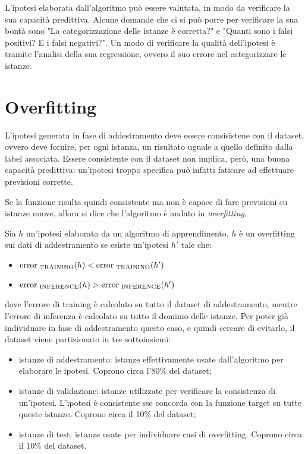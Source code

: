 L'ipotesi elaborata dall'algoritmo può essere valutata, in modo da verificare la
sua capacità predittiva. Alcune domande che ci si può porre per verificare la
sua bontà sono "La categorizzazione delle istanze è corretta?" e "Quanti sono i
falsi positivi? E i falsi negativi?".
Un modo di verificare la qualità dell'ipotesi è tramite l'analisi della sua
regressione, ovvero il suo errore nel categorizzare le istanze.

\section{Overfitting}
L'ipotesi generata in fase di addestramento deve essere consisistene con il
dataset, ovvero deve fornire, per ogni istanza, un risultato uguale a quello
definito dalla label associata.
Essere consistente con il dataset non implica, però, una buona capacità
predittiva: un'ipotesi troppo specifica può infatti faticare ad effettuare
previsioni corrette.

Se la funzione risulta quindi consistente ma non è capace di fare previsioni su
istanze nuove, allora si dice che l'algoritmo è andato in \textit{overfitting}.

Sia $h$ un'ipotesi elaborata da un algoritmo di apprendimento, $h$ è un
overfitting sui dati di addestramento se esiste un'ipotesi $h'$ tale che:
\begin{itemize}
    \item $\textnormal{error}_{\textnormal{ TRAINING}} (h) < 
    \textnormal{error}_{\textnormal{ TRAINING}} (h')$
    \item $\textnormal{error}_{\textnormal{ INFERENCE}} (h) > 
    \textnormal{error}_{\textnormal{ INFERENCE}} (h')$
\end{itemize}
dove l'errore di training è calcolato su tutto il dataset di addestramento,
mentre l'errore di inferenza è calcolato su tutto il dominio delle istanze.
Per poter già individuare in fase di addestramento questo caso, e quindi cercare
di evitarlo, il dataset viene partizionato in tre sottoinsiemi:
\begin{itemize}
    \item istanze di addestramento: istanze effettivamente usate dall'algoritmo
    per elaborare le ipotesi. Coprono circa l'80\% del dataset;
    \item istanze di validazione: istanze utilizzate per verificare la
    consistenza di un'ipotesi. L'ipotesi è consistente sse concorda con la
    funzione target su tutte queste istanze. Coprono circa il 10\% del dataset;
    \item istanze di test: istanze usate per individuare casi di overfitting.
    Coprono circa il 10\% del dataset.
\end{itemize}